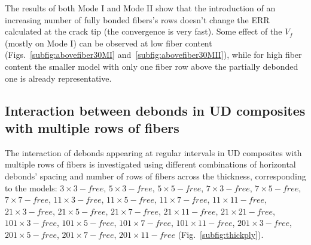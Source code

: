 \documentclass[review]{elsarticle}
\begin{document}
The results of both Mode I and Mode II show that the introduction of an increasing number of fully bonded fibers's rows doesn't change the ERR calculated at the crack tip (the convergence is very fast). Some effect of the $V_{f}$ (mostly on Mode I) can be observed at low fiber content (Figs.~\ref{subfig:abovefiber30MI} and~\ref{subfig:abovefiber30MII}), while for high fiber content the smaller model with only one fiber row above the partially debonded one is already representative.

\subsection{Interaction between debonds in UD composites with multiple rows of fibers}

The interaction of debonds appearing at regular intervals in UD composites with multiple rows of fibers is investigated using different combinations of horizontal debonds' spacing and number of rows of fibers across the thickness, corresponding to the models: $3\times 3-free$, $5\times 3-free$, $5\times 5-free$, $7\times 3-free$, $7\times 5-free$, $7\times 7-free$, $11\times 3-free$, $11\times 5-free$, $11\times 7-free$, $11\times 11-free$, $21\times 3-free$, $21\times 5-free$, $21\times 7-free$, $21\times 11-free$, $21\times 21-free$, $101\times 3-free$, $101\times 5-free$, $101\times 7-free$, $101\times 11-free$, $201\times 3-free$, $201\times 5-free$, $201\times 7-free$, $201\times 11-free$  (Fig.~\ref{subfig:thickply}).
\end{document}
